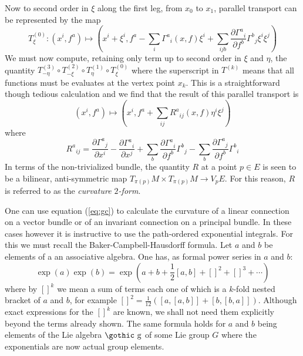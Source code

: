 \documentclass[12pt,titlepage]{article}
\def\goth#1{\hbox{\gothic #1}}
\def\gg{{\goth g}}
\begin{document}
Now to second order in \(\xi\) along the first leg, from \(x_0\) to
\(x_1\),
parallel transport can be represented by the map
\[
T_\xi^{(0)} :(x^i,f^a) \mapsto (x^i+\xi^i,
f^a-\sum_i\Gamma^a{}_i(x,f)\xi^i
+\sum_{ijb}\frac{\partial \Gamma^a{}_i}{\partial f^b}\Gamma^b{}_j
\xi^i\xi^j) 
\]
We must now compute, retaining only term up to second order in \(\xi\)
and \(\eta\), the quantity \(T_{-\eta}^{(3)}\circ T_{-\xi}^{(2)}\circ
T_\eta^{(1)}\circ T_\xi^{(0)}\) where the superscript  in \(T^{(k)}\)
means that all functions must be evaluates at the vertex point \(x_k\).
This is a straightforward though tedious calculation and we find that
the result of this parallel transport is
\[%
(x^i,f^a) \mapsto (x^i, f^a + \sum_{ij}R^a{}_{ij}(x,f)\eta^i\xi^j)
\]%
where
\begin{equation}\label{eq:gc}%
R^a{}_{ij} = \frac{\partial \Gamma^a{}_j}{\partial x^i}
-\frac{\partial \Gamma^a{}_i}{\partial x^j} +
\sum_b\frac{\partial\Gamma^a{}_i}{\partial f^b}\Gamma^b{}_j -
\sum_b\frac{\partial \Gamma^a{}_j}{\partial
f^b}\Gamma^b{}_i
\end{equation}%
In terms of the non-trivialized bundle, the quantity \(R\) at a point
\(p\in E\) is seen to be a bilinear, anti-symmetric map
\(T_{\pi(p)}M \times T_{\pi(p)}M \to V_pE\). For this reason,
\(R\) is referred to as the {\em curvature \(2\)-form\/}.
%


One can use equation (\ref{eq:gc}) to calculate the curvature of a
linear connection on a vector bundle or of an invariant connection on a
principal bundle. In these cases however it is instructive to use the
path-ordered exponential integrals. For this we must recall the
Baker-Campbell-Hausdorff formula. Let  \(a\) and \(b\) be elements of a
an associative algebra.
One has, as formal power series in
\(a\) and \(b\):
\begin{equation}\label{eq:bch}%
\exp (a) \exp( b) = \exp\left(a + b + \frac{1}{2}[a,b] + []^2 + []^3 +
\cdots
\right)
\end{equation}%
where by \([]^k\) we mean a sum of terms each one of which is a
\(k\)-fold nested bracket of \(a\) and \(b\), for example \([]^2 =
\frac{1}{12}([a,[a,b]]+[b,[b,a]])\). Although exact expressions for the
\([]^k\) are known, we shall not need them explicitly beyond the terms
already shown. The same formula holds for \(a\) and \(b\) being elements
of the Lie algebra \(\gg\) of some Lie group \(G\) where the exponentials
are now actual group elements.
\end{document}

